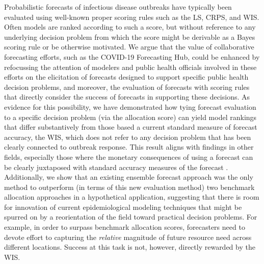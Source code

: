 \documentclass{article}\usepackage[]{graphicx}\usepackage[]{xcolor}
\begin{document}
Probabilistic forecasts of infectious disease outbreaks have typically been evaluated using well-known proper scoring
rules such as the LS, CRPS, and WIS. Often models are ranked according to such a score, but without reference to any
underlying decision problem from which the score might be derivable as a Bayes scoring rule or be otherwise motivated.
We argue that the value of collaborative forecasting efforts, such as the COVID-19 Forecasting Hub, could be enhanced by
refocussing the attention of modelers and public health officials involved in these efforts on the elicitation of
forecasts designed to support specific public health decision problems, and moreover, the evaluation of forecasts with
scoring rules that directly consider the success of forecasts in supporting these decisions. As evidence for this
possibility, we have demonstrated how tying forecast evaluation to a specific decision problem (via the allocation
score) can yield model rankings that differ substantively from those based a current standard measure of forecast
accuracy, the WIS, which does not refer to any decision problem that has been clearly connected to outbreak response.
This result aligns with findings in other fields, especially those where the monetary consequences of using a forecast
can be clearly juxtaposed with standard accuracy measures of the forecast \citep{leitch1991economicForecastEval,
murphy1993whatisagoodforecast, cenesizoglu2012returnPredictionEconValue}. Additionally, we show that an existing
ensemble forecast approach was the only method to outperform (in terms of this new evaluation method) two benchmark
allocation approaches in a hypothetical application, suggesting that there is room for innovation of current
epidemiological modeling techniques that might be spurred on by a reorientation of the field toward practical decision
problems. For example, in order to surpass benchmark allocation scores, forecasters need to devote effort to capturing
the \emph{relative} magnitude of future resource need across different locations.  Success at this task is not, however,
directly rewarded by the WIS. 
\end{document}
